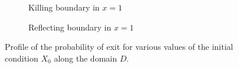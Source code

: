\begin{figure}[t]
    \centering
    \begin{subfigure}{0.49\linewidth}
        \centering
        \resizebox{1\linewidth}{!}{ }  
        \caption{Killing boundary in $x = 1$}
        \label{fig:KillPhiProfiles}
    \end{subfigure}
    \begin{subfigure}{0.49\linewidth}
        \centering
        \resizebox{1\linewidth}{!}{ }  
        \caption{Reflecting boundary in $x = 1$}
        \label{fig:ReflectPhiProfiles}
    \end{subfigure}    
    \caption{Profile of the probability of exit for various values of the initial condition $X_0$ along the domain $D$.}
    \label{fig:PhiProfiles}
\end{figure}


